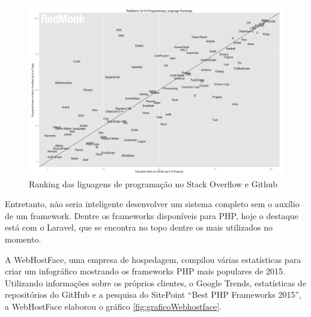 \begin{figure}
	\label{fig:graficoRedmonk}
	\includegraphics[width=1\textwidth]{img/grafico_redmonk}
	\caption{Ranking das liguagens de programação no Stack Overflow e Github}
\end{figure}


Entretanto, não seria inteligente desenvolver um sistema completo sem o auxílio de um framework. Dentre os frameworks disponíveis para PHP, hoje o destaque está com o Laravel, que se encontra no topo dentre os mais utilizados no momento. 
 

A WebHostFace, uma empresa de hospedagem, compilou várias estatísticas para criar um infográfico mostrando os frameworks PHP mais populares de 2015. Utilizando informações sobre os próprios clientes, o Google Trends, estatísticas de repositórios do GitHub e a pesquisa do SitePoint “Best PHP Frameworks 2015”, a WebHostFace elaborou o gráfico \ref{fig:graficoWebhostface}. %


